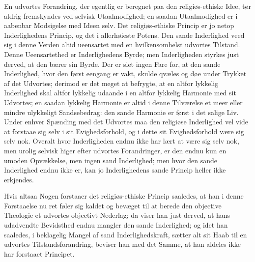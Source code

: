 \documentclass[12pt,a4paper]{book}
\newcommand{\opage}[1]{\marginnote{\footnotesize\textit{[#1]}}}
\begin{document}
En udvortes Forandring, der egentlig er beregnet paa den religiøs-ethiske
Idee, tør aldrig fremskyndes ved selvisk Utaalmodighed; en saadan
Utaalmodighed er i aabenbar Modsigelse med Ideen selv. Det religiøs-ethiske
Princip er jo netop Inderlighedens Princip, og det i allerhøieste Potens. Den
sande Inderlighed veed sig i denne Verden altid ueensartet med en
hvilkensomhelst udvortes Tilstand. Denne Ueensartethed er Inderlighedens
Byrde; men Inderligheden styrkes just derved, at den bærer sin Byrde. Der er
slet ingen Fare for, at den sande Inderlighed, hvor den først eengang er
vakt, skulde qvæles og døe under Trykket af det Udvortes; derimod er det
meget at befrygte, at en altfor lykkelig Inderlighed skal altfor lykkelig
udaande i en altfor lykkelig Harmonie med sit Udvortes; en saadan lykkelig
Harmonie er altid i denne Tilværelse et meer eller mindre ulykkeligt
Sandsebedrag: den sande Harmonie er først i det salige Liv. Under enhver
Spænding med det Udvortes maa den religiøse Inderlighed vel vide at forstaae
sig selv i sit Evighedsforhold, og i dette sit Evighedsforhold være sig selv
nok. Overalt hvor Inderligheden endnu ikke har lært at være sig selv nok, men
urolig selvisk higer efter udvortes Forandringer, er den endnu kun en umoden
Opvækkelse, men ingen sand Inderlighed; men hvor den sande Inderlighed endnu
ikke er, kan jo Inderlighedens sande Princip heller ikke erkjendes.

Hvis altsaa Nogen forstaaer det religiøs-ethiske Princip saaledes, at han i
denne Forstaaelse nu ret føler sig kaldet og
\opage{168} bevæget til at berede den objective Theologie et udvortes objectivt Nederlag;
da viser han just derved, at hans udadvendte Bevidsthed endnu mangler den
sande Inderlighed; og idet han saaledes, i beklagelig Mangel af sand
Inderlighedskraft, sætter alt sit Haab til en udvortes Tilstandsforandring,
beviser han med det Samme, at han aldeles ikke har forstaaet Principet.
\end{document}
